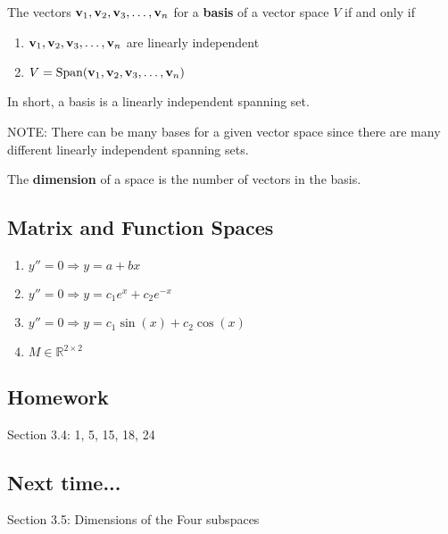 \begin{tcolorbox}[colback=yellow!10!,colframe=gray!15!]

\begin{definition}
	The vectors ${\bf v}_1, {\bf v}_2, {\bf v}_3, \dots , {\bf v}_n$ for a \textbf{basis} of a vector space $V$ if and only if
	\begin{enumerate}
		\item ${\bf v}_1, {\bf v}_2, {\bf v}_3, \dots , {\bf v}_n$  are linearly independent
		\item $V = \text{Span}({\bf v}_1, {\bf v}_2, {\bf v}_3, \dots , {\bf v}_n)$ 
	\end{enumerate}
	
	In short, a basis is a linearly independent spanning set.
\end{definition}


\end{tcolorbox}



NOTE: There can be many bases for a given vector space since there are many different linearly independent spanning sets.








\begin{tcolorbox}[colback=yellow!10!,colframe=gray!15!]

\begin{definition}
	The \textbf{dimension} of a space is the number of vectors in the basis.
\end{definition}


\end{tcolorbox}








\subsection*{Matrix and Function Spaces}

\begin{enumerate}
	\item $y'' = 0   \Rightarrow y = a + bx$
	\item $y'' = 0   \Rightarrow y = c_1e^x + c_2 e^{-x}$
	\item $y'' = 0   \Rightarrow y = c_1 \sin(x) + c_2 \cos(x)$
	\item $M \in \mathbb{R}^{2 \times 2}$
\end{enumerate}




\subsection*{Homework}
Section 3.4:  1, 5, 15, 18, 24 




\subsection*{Next time...}
Section 3.5: Dimensions of the Four subspaces

